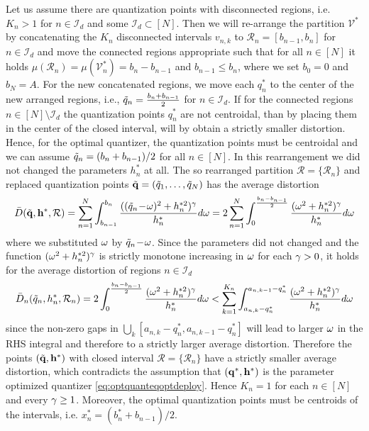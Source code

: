 \documentclass[smallabstract,smallcaptions]{dccpaper}
\newcommand{\Ind}{\mathcal{I}}
\renewcommand{\vp}{\mathbf q}
\newcommand{\Vor}{\ensuremath{\mathcal{V}}}         %
\newcommand{\Rset}{\ensuremath{\mathcal R}}
\newcommand{\Dis}{\ensuremath{D}}                    %
\newcommand{\AvDis}{\ensuremath{\bar{\Dis}}}         %
\begin{document}
  Let us assume there are quantization points with disconnected regions, i.e. $K_n>1$ for $n\in\Ind_d$ and some
  $\Ind_d\subset[N]$. Then we will re-arrange the partition $\Vor^*$ by concatenating the $K_n$ disconnected
  intervals $v_{n,k}$ to $\Rset_n=[b_{n-1},b_{n}]$ for $n\in\Ind_d$ and move the connected regions appropriate such that
  for all $n\in[N]$ it holds $\mu(\Rset_n)=\mu(\Vor^*_n)=b_n-b_{n-1}$ and $b_{n-1}\leq b_{n}$, where we set $b_0=0$ and
  $b_N=A$. For the new concatenated regions, we move each $q_n^*$ to the center of the new arranged regions, i.e.,
  $\tilde{q}_n=\frac{b_n+b_{n-1}}{2}$ for $n\in\Ind_d$. If for the connected regions $n\in[N]\setminus\Ind_d$  the
  quantization points $q^*_n$ are not centroidal, than by placing them in the center of the closed interval,
  will by  obtain a strictly smaller distortion. Hence, for the optimal quantizer, the quantization
  points must be centroidal and we can assume $\tilde{q}_n=(b_n+b_{n-1})/2$ for all $n\in[N]$. 
  In this rearrangement we did not changed the parameters $h_n^*$ at all.  The so rearranged partition
  $\Rset=\{\Rset_n\}$ and replaced quantization points $\tvp=(\tq_1,\dots,\tq_N)$ has the average distortion 
  \begin{align}
    \AvDis(\tvp,\vh^*,\Rset)=\sum_{n=1}^N \int_{b_{n-1}}^{b_n} \frac{ ((\tq_n\!-\!\ome)^2+h_n^{*2})^{\gam}}{h_n^{*}} d\ome
      = 2\sum_{n=1}^N \int_{0}^{\frac{b_n-b_{n-1}}{2}} \frac{ (\ome^2+h_n^{*2})^{\gam}}{h_n^{*}} d\ome
  \end{align}
  where we substituted $\omega$ by $\tilde{q}_n\!-\!\omega$. Since the parameters did not changed and the function
  $(\omega^2+h_n^{*2})^{\gamma}$ is strictly monotone increasing in $\omega$ for each $\gamma>0$, it holds for the average
  distortion of regions $n\in\Ind_d$
  \begin{align}
   \AvDis_n(\tq_n,h_n^*,\Rset_n)=    2\int_{0}^{\frac{b_n-b_{n-1}}{2}} \frac{ (\ome^2+h_n^{*2})^{\gam}}{h_n^{*}} d\ome 
    < \sum_{k=1}^{K_n}\int_{a_{n,k}-q_n^*}^{a_{n,k-1}-q_n^*} \frac{ (\ome^2+h_n^{*2})^{\gam}}{h_n^{*}}
    d\ome\label{eq:Avdisn}
  \end{align}
  since the non-zero gaps in $\bigcup_k [a_{n,k}-q_n^*,a_{n,k-1}-q_n^*]$ will lead to larger $\omega$ in the RHS integral
  and therefore to a strictly larger average distortion.  Therefore the points $(\tvp,\vh^*)$ with closed interval
  $\Rset=\{\Rset_n\}$ have a strictly smaller average distortion, which contradicts the assumption that $(\vp^*,\vh^*)$ is the
  parameter optimized quantizer \eqref{eq:optquanteqoptdeploy}. Hence $K_n=1$ for each $n\in[N]$ and every $\gamma\geq 1$.
  Moreover, the optimal quantization points must be centroids of the intervals, i.e. $x_n^*=(b_n^*+b_{n-1})/2$.
\end{document}
